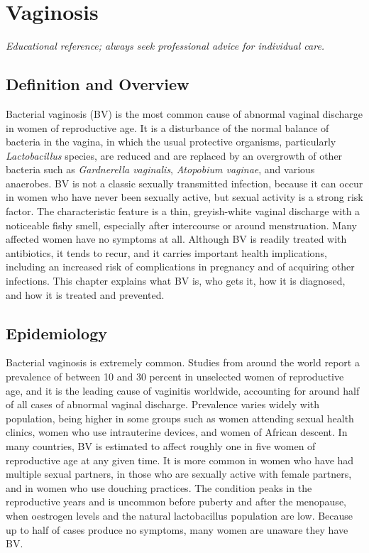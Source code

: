 \chapter{Vaginosis}

\medskip
\noindent\textit{Educational reference; always seek professional advice for individual care.}

\section*{Definition and Overview}
Bacterial vaginosis (BV) is the most common cause of abnormal vaginal discharge in women of reproductive age. It is a disturbance of the normal balance of bacteria in the vagina, in which the usual protective organisms, particularly \textit{Lactobacillus} species, are reduced and are replaced by an overgrowth of other bacteria such as \textit{Gardnerella vaginalis}, \textit{Atopobium vaginae}, and various anaerobes. BV is not a classic sexually transmitted infection, because it can occur in women who have never been sexually active, but sexual activity is a strong risk factor. The characteristic feature is a thin, greyish-white vaginal discharge with a noticeable fishy smell, especially after intercourse or around menstruation. Many affected women have no symptoms at all. Although BV is readily treated with antibiotics, it tends to recur, and it carries important health implications, including an increased risk of complications in pregnancy and of acquiring other infections. This chapter explains what BV is, who gets it, how it is diagnosed, and how it is treated and prevented.

\section*{Epidemiology}
Bacterial vaginosis is extremely common. Studies from around the world report a prevalence of between 10 and 30 percent in unselected women of reproductive age, and it is the leading cause of vaginitis worldwide, accounting for around half of all cases of abnormal vaginal discharge. Prevalence varies widely with population, being higher in some groups such as women attending sexual health clinics, women who use intrauterine devices, and women of African descent. In many countries, BV is estimated to affect roughly one in five women of reproductive age at any given time. It is more common in women who have had multiple sexual partners, in those who are sexually active with female partners, and in women who use douching practices. The condition peaks in the reproductive years and is uncommon before puberty and after the menopause, when oestrogen levels and the natural lactobacillus population are low. Because up to half of cases produce no symptoms, many women are unaware they have BV.

